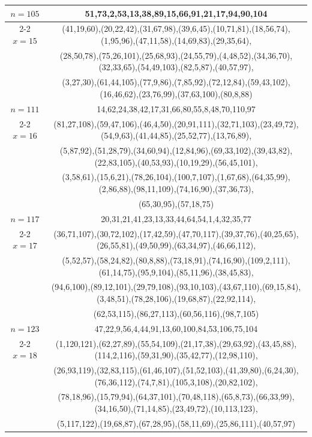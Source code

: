 \begin{tabular}{| c | c |}
\hline 
\(n=105\) & 
51,73,2,53,13,38,89,15,66,91,21,17,94,90,104\\
\cline{2-2}
\(x=15\)
&(41,19,60),(20,22,42),(31,67,98),(39,6,45),(10,71,81),(18,56,74),(1,95,96),(47,11,58),(14,69,83),(29,35,64),\\
&(28,50,78),(75,26,101),(25,68,93),(24,55,79),(4,48,52),(34,36,70),(32,33,65),(54,49,103),(82,5,87),(40,57,97),\\
&(3,27,30),(61,44,105),(77,9,86),(7,85,92),(72,12,84),(59,43,102),(16,46,62),(23,76,99),(37,63,100),(80,8,88)\\
\hline 
\(n=111\) & 
14,62,24,38,42,17,31,66,80,55,8,48,70,110,97\\
\cline{2-2}
\(x=16\)
&(81,27,108),(59,47,106),(46,4,50),(20,91,111),(32,71,103),(23,49,72),(54,9,63),(41,44,85),(25,52,77),(13,76,89),\\
&(5,87,92),(51,28,79),(34,60,94),(12,84,96),(69,33,102),(39,43,82),(22,83,105),(40,53,93),(10,19,29),(56,45,101),\\
&(3,58,61),(15,6,21),(78,26,104),(100,7,107),(1,67,68),(64,35,99),(2,86,88),(98,11,109),(74,16,90),(37,36,73),\\
&(65,30,95),(57,18,75)\\
\hline 
\(n=117\) & 
20,31,21,41,23,13,33,44,64,54,1,4,32,35,77\\
\cline{2-2}
\(x=17\)
&(36,71,107),(30,72,102),(17,42,59),(47,70,117),(39,37,76),(40,25,65),(26,55,81),(49,50,99),(63,34,97),(46,66,112),\\
&(5,52,57),(58,24,82),(80,8,88),(73,18,91),(74,16,90),(109,2,111),(61,14,75),(95,9,104),(85,11,96),(38,45,83),\\
&(94,6,100),(89,12,101),(29,79,108),(93,10,103),(43,67,110),(69,15,84),(3,48,51),(78,28,106),(19,68,87),(22,92,114),\\
&(62,53,115),(86,27,113),(60,56,116),(98,7,105)\\
\hline 
\(n=123\) & 
47,22,9,56,4,44,91,13,60,100,84,53,106,75,104\\
\cline{2-2}
\(x=18\)
&(1,120,121),(62,27,89),(55,54,109),(21,17,38),(29,63,92),(43,45,88),(114,2,116),(59,31,90),(35,42,77),(12,98,110),\\
&(26,93,119),(32,83,115),(61,46,107),(51,52,103),(41,39,80),(6,24,30),(76,36,112),(74,7,81),(105,3,108),(20,82,102),\\
&(78,18,96),(15,79,94),(64,37,101),(70,48,118),(65,8,73),(66,33,99),(34,16,50),(71,14,85),(23,49,72),(10,113,123),\\
&(5,117,122),(19,68,87),(67,28,95),(58,11,69),(25,86,111),(40,57,97)\\

\end{tabular}

